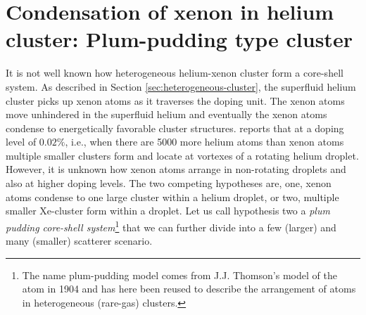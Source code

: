 \section{Condensation of xenon in helium cluster: Plum-pudding type cluster}\label{sec:helium-data}
It is not well known how heterogeneous helium-xenon cluster form a core-shell system. As described in Section \ref{sec:heterogeneous-cluster}, the superfluid helium cluster picks up xenon atoms as it traverses the doping unit. The xenon atoms move unhindered in the superfluid helium and eventually the xenon atoms condense to energetically favorable cluster structures. \citep{Gomez-2014-Science} reports that at a doping level of $0.02\%$, i.e., when there are 5000 more helium atoms than xenon atoms multiple smaller clusters form and locate at vortexes of a rotating helium droplet. However, it is unknown how xenon atoms arrange in non-rotating droplets and also at higher doping levels. The two competing hypotheses are, one, xenon atoms condense to one large cluster within a helium droplet, or two, multiple smaller Xe-cluster form within a droplet. Let us call hypothesis two a \textit{plum pudding core-shell system}\footnote{The name plum-pudding model comes from J.J. Thomson's model of the atom in 1904 and has here been reused to describe the arrangement of atoms in heterogeneous (rare-gas) clusters.} that we can further divide into a few (larger) and many (smaller) scatterer scenario.\\
